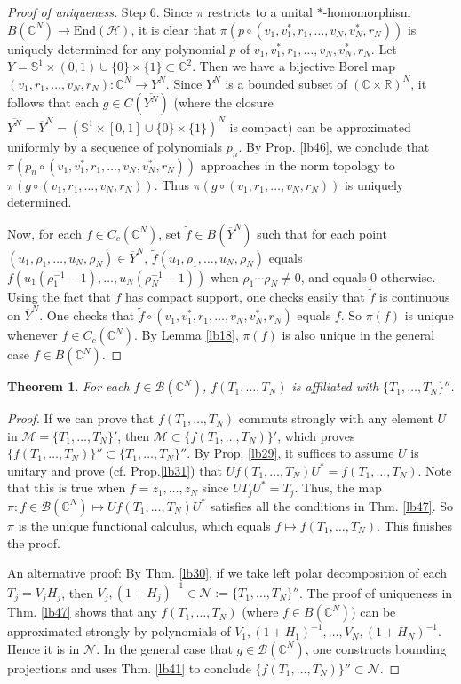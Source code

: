 \documentclass[12pt,a4paper,notitlepage]{article}
\theoremstyle{definition}
\theoremstyle{plain}
\newtheorem{thm}[df]{Theorem}
\newcommand{\mc}{\mathcal}
\newcommand{\wtd}{\widetilde}
\newcommand{\ovl}{\overline}
\newcommand{\End}{\mathrm{End}} %
\newcommand{\scr}{\mathscr}
\newcommand{\mbb}{\mathbb}
\newcommand{\Cbb}{\mathbb C}
\newcommand{\Rbb}{\mathbb R}
\numberwithin{equation}{section}
\begin{document}
\begin{proof}[Proof of uniqueness]
Step 6. Since $\pi$ restricts to a unital $*$-homomorphism $B(\Cbb^N)\rightarrow\End(\mc H)$, it is clear that $\pi(p\circ(v_1,v_1^*,r_1,\dots,v_N,v_N^*,r_N))$ is uniquely determined for any polynomial $p$ of $v_1,v_1^*,r_1,\dots,v_N,v_N^*,r_N$. Let $Y=\mbb S^1\times (0,1)\cup \{0\}\times \{1\}\subset \Cbb^2$.  Then we have a bijective Borel map $(v_1,r_1,\dots,v_N,r_N):\Cbb^N\rightarrow Y^N$. Since $Y^N$ is a bounded subset of $(\Cbb\times\Rbb)^N$, it follows that  each $g\in C(\ovl {Y^N})$ (where the closure $\ovl{Y^N}=\ovl Y^N=(\mbb S^1\times[0,1]\cup \{0\}\times\{1\})^N$ is compact) can be approximated uniformly by a sequence of polynomials $p_n$. By Prop. \ref{lb46}, we conclude that $\pi(p_n\circ(v_1,v_1^*,r_1,\dots,v_N,v_N^*,r_N))$ approaches in the norm topology to $\pi(g\circ(v_1,r_1,\dots,v_N,r_N))$. Thus $\pi(g\circ(v_1,r_1,\dots,v_N,r_N))$ is uniquely determined.

Now, for each $f\in C_c(\Cbb^N)$, set $\wtd f\in B(\ovl Y^N)$ such that for each point $(u_1,\rho_1,\dots,u_N,\rho_N)\in \ovl Y^N$,  $\wtd f(u_1,\rho_1,\dots,u_N,\rho_N)$ equals $f(u_1(\rho_1^{-1}-1),\dots,u_N(\rho_N^{-1}-1))$ when $\rho_1\cdots\rho_N\neq0$, and equals $0$ otherwise. Using the fact that $f$ has compact support, one checks easily that $\wtd f$ is continuous on $\ovl Y^N$. One checks that $\wtd f\circ(v_1,v_1^*,r_1,\dots,v_N,v_N^*,r_N)$ equals $f$. 
So $\pi(f)$ is unique whenever $f\in C_c(\Cbb^N)$. By Lemma \ref{lb18}, $\pi(f)$ is also unique in the general case $f\in B(\Cbb^N)$.
\end{proof}


\begin{thm}\label{lb50}
For each $f\in\scr B(\Cbb^N)$, $f(T_1,\dots,T_N)$ is affiliated with $\{T_1,\dots,T_N\}''$.
\end{thm}

\begin{proof}
If we can prove that $f(T_1,\dots,T_N)$ commuts strongly with any element $U$ in $\mc M=\{T_1,\dots,T_N\}'$, then $\mc M\subset\{f(T_1,\dots,T_N)\}'$, which proves $\{f(T_1,\dots,T_N)\}''\subset \{T_1,\dots,T_N\}''$. By Prop. \ref{lb29}, it suffices to assume $U$ is unitary and prove (cf. Prop.\ref{lb31}) that $Uf(T_1,\dots,T_N)U^*=f(T_1,\dots,T_N)$. Note that this is true when $f=z_1,\dots,z_N$ since $UT_jU^*=T_j$. Thus, the map $\pi:f\in\scr B(\Cbb^N)\mapsto Uf(T_1,\dots,T_N)U^*$ satisfies all the conditions in Thm. \ref{lb47}. So $\pi$ is the unique functional calculus, which equals $f\mapsto f(T_1,\dots,T_N)$. This finishes the proof.

An alternative proof: By Thm. \ref{lb30}, if we take left polar decomposition of each $T_j=V_jH_j$, then $V_j,(1+H_j)^{-1}\in\mc N:=\{T_1,\dots,T_N\}''$. The proof of uniqueness in Thm. \ref{lb47} shows that any $f(T_1,\dots,T_N)$ (where $f\in B(\Cbb^N)$) can be approximated strongly by polynomials of $V_1,(1+H_1)^{-1},\dots,V_N,(1+H_N)^{-1}$. Hence it is in $\mc N$. In the general case that $g\in\scr B(\Cbb^N)$, one constructs bounding projections and uses Thm. \ref{lb41} to conclude $\{f(T_1,\dots,T_N)\}''\subset\mc N$.
\end{proof}
\end{document}
